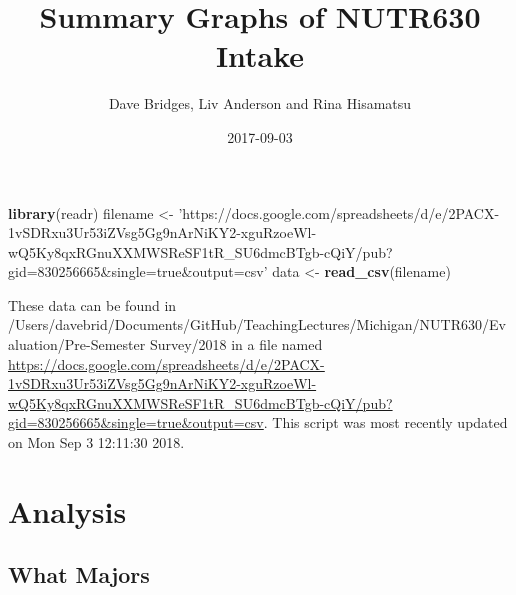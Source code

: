 \documentclass[]{article}
\title{Summary Graphs of NUTR630 Intake}
\author{Dave Bridges, Liv Anderson and Rina Hisamatsu}
\date{2017-09-03}
\newenvironment{Shaded}{\begin{snugshade}}{\end{snugshade}}
\newcommand{\KeywordTok}[1]{\textcolor[rgb]{0.13,0.29,0.53}{\textbf{#1}}}
\newcommand{\StringTok}[1]{\textcolor[rgb]{0.31,0.60,0.02}{#1}}
\newcommand{\NormalTok}[1]{#1}
\begin{document}
\maketitle

{
\setcounter{tocdepth}{2}
\tableofcontents
}
\begin{Shaded}
\begin{Highlighting}[]
\KeywordTok{library}\NormalTok{(readr)}
\NormalTok{filename <-}\StringTok{ 'https://docs.google.com/spreadsheets/d/e/2PACX-1vSDRxu3Ur53iZVsg5Gg9nArNiKY2-xguRzoeWl-wQ5Ky8qxRGnuXXMWSReSF1tR_SU6dmcBTgb-cQiY/pub?gid=830256665&single=true&output=csv'}
\NormalTok{data <-}\StringTok{ }\KeywordTok{read_csv}\NormalTok{(filename)}
\end{Highlighting}
\end{Shaded}

These data can be found in
/Users/davebrid/Documents/GitHub/TeachingLectures/Michigan/NUTR630/Evaluation/Pre-Semester
Survey/2018 in a file named
\url{https://docs.google.com/spreadsheets/d/e/2PACX-1vSDRxu3Ur53iZVsg5Gg9nArNiKY2-xguRzoeWl-wQ5Ky8qxRGnuXXMWSReSF1tR_SU6dmcBTgb-cQiY/pub?gid=830256665\&single=true\&output=csv}.
This script was most recently updated on Mon Sep 3 12:11:30 2018.

\section{Analysis}\label{analysis}

\subsection{What Majors}\label{what-majors}
\end{document}
